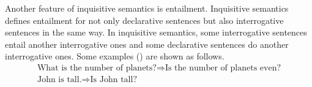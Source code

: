 \documentclass[a4paper,11pt, leqno]{article}
\begin{document}
Another feature of inquisitive semantics is entailment. Inquisitive semantics defines entailment for not only declarative sentences but also interrogative sentences in the same way. In inquisitive semantics, some interrogative sentences entail another interrogative ones and some declarative sentences do another interrogative ones. Some examples (\citet{ciardelli2012inquisitive}) are shown as follows.
\begin{align}
\mbox{What is the number of planets?} \Rightarrow \mbox{Is the number of planets even?} \\
\mbox{John is tall.} \Rightarrow  \mbox{Is John tall?}
\end{align}
\begin{comment}
Inqusitive semanticsのcompositionalな拡張と前提を扱った拡張について触れるべきか悩んでいる。model theoryではなく依存型でやったということで十分面白いと判断されるなら不要か??
\par
Some extensions of inquisitive semantics have been published. Compositional Inquisitive Semantics(\citet{Ciardelli2017}) meets the principle of compositionality and the difference between alternative semantics and inquisitive semantics is explained in this study. 
\end{comment}
\end{document}
